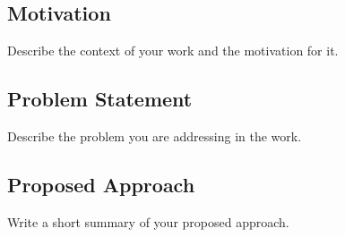 \documentclass[../report.tex]{subfiles}
\begin{document}
    \subsection{Motivation}
    \label{sec:introduction:motivation}

    Describe the context of your work and the motivation for it.

    \subsection{Problem Statement}
    \label{sec:introduction:problem_statement}

    Describe the problem you are addressing in the work.

    \subsection{Proposed Approach}
    \label{sec:introduction:proposed_approach}

    Write a short summary of your proposed approach.
\end{document}
